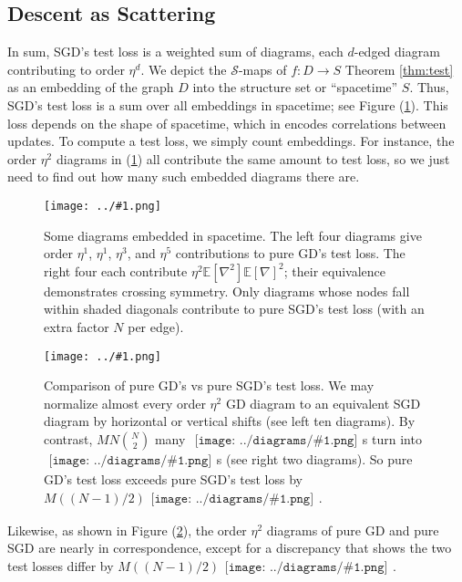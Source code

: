 \documentclass{article}
\newcommand{\Ss}{\mathcal{S}}
\newcommand{\expct}[1]{\mathbb{E}\left[#1\right]}
\newcommand{\plotmoo}[3]{
    \texttt{[image: ../\#1.png]}
}
\newcommand{\sdia}[1]{\begin{gathered}\texttt{[image: ../diagrams/\#1.png]}\end{gathered}}
\begin{document}
\subsection{Descent as Scattering}
    In sum, SGD's test loss is a weighted sum of diagrams, each $d$-edged
    diagram contributing to order $\eta^d$.  We depict the $\Ss$-maps of
    $f:D\to S$ Theorem \ref{thm:test} as an embedding of the graph $D$ into
    the structure set or ``spacetime'' $S$.  Thus, SGD's test loss is a sum
    over all embeddings in spacetime; see Figure (\ref{fig:spacetime}).  This
    loss depends on the shape of spacetime, which in encodes correlations
    between updates.  To compute a test loss, we simply count embeddings.
    For instance, the order $\eta^2$ diagrams in (\ref{fig:spacetime}) all 
    contribute the same amount to test loss, so we just need to find out how
    many such embedded diagrams there are.   
    \begin{figure}[h!] \label{fig:spacetime}
        \centering  
        \plotmoo{diagrams/spacetime}{\columnwidth}{3.0cm}  
        \caption{
            Some diagrams embedded in spacetime.  The left four diagrams
            give order $\eta^1$, $\eta^1$, $\eta^3$, and $\eta^5$
            contributions to pure GD's test loss.  The right four each
            contribute $\eta^2 \expct{\nabla^2} \expct{\nabla}^2$; their
            equivalence demonstrates crossing symmetry.  Only diagrams
            whose nodes fall within shaded diagonals contribute to pure SGD's
            test loss (with an extra factor $N$ per edge). 
        }
    \end{figure}
    \begin{figure}[h!] \label{fig:vsmulti}
        \centering  
        \plotmoo{diagrams/spacetime-b}{\columnwidth}{3.0cm}
        \caption{
            Comparison of pure GD's vs pure SGD's test loss.  We may
            normalize almost every order $\eta^2$ GD diagram to an
            equivalent SGD diagram by horizontal or vertical shifts (see
            left ten diagrams).  By contrast, $MN{N\choose 2}$ many
            $\sdia{(01-2)(01-12)}$s turn into $\sdia{(0-1-2)(01-12)}$s (see
            right two diagrams).  So pure GD's test loss exceeds pure SGD's
            test loss by $M ((N-1)/2) \sdia{c(01-2)(01-12)}$.
        }
    \end{figure}
    Likewise, as shown in Figure
    (\ref{fig:vsmulti}), the order $\eta^2$ diagrams of pure GD
    and pure SGD are nearly in correspondence, except for a discrepancy that
    shows the two test losses differ by $M ((N-1)/2) \sdia{c(01-2)(01-12)}$.
\end{document}
